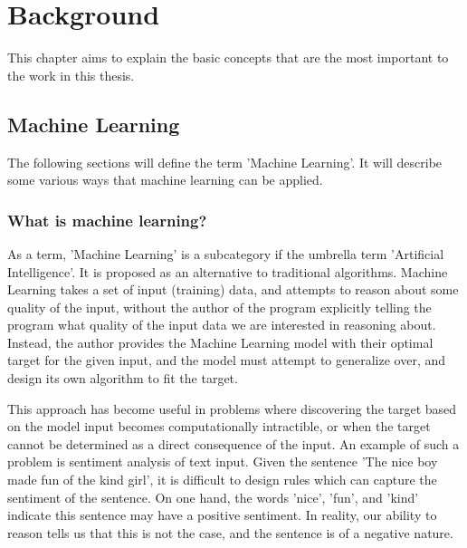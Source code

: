 \chapter{Background}

This chapter aims to explain the basic concepts that are the most important to the work in this thesis.


\section{Machine Learning}

The following sections will define the term 'Machine Learning'. 
It will describe some various ways that machine learning can be applied.



\subsection{What is machine learning?}

As a term, 'Machine Learning' is a subcategory if the umbrella term 'Artificial Intelligence'.
It is proposed as an alternative to traditional algorithms. 
Machine Learning takes a set of input (training) data, and attempts to reason about some quality of the input, 
without the author of the program explicitly telling the program what quality of the input data we are interested in reasoning about.
Instead, the author provides the Machine Learning model with their optimal target for the given input,
and the model must attempt to generalize over, and design its own algorithm to fit the target.

This approach has become useful in problems where discovering the target based on the model input becomes computationally intractible,
or when the target cannot be determined as a direct consequence of the input. 
An example of such a problem is sentiment analysis of text input. 
Given the sentence 'The nice boy made fun of the kind girl', 
it is difficult to design rules which can capture the sentiment of the sentence.
On one hand, the words 'nice', 'fun', and 'kind' indicate this sentence may have a positive sentiment.
In reality, our ability to reason tells us that this is not the case, and the sentence is of a negative nature.

